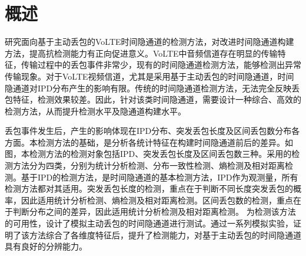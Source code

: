 \section{概述}
\label{chap:analyze:overview}

研究面向基于主动丢包的VoLTE时间隐通道的检测方法，对改进时间隐通道构建方法，提高抗检测能力有正向促进意义。VoLTE中音频信道存在明显的传输特征，传输过程中的丢包事件非常少，现有的时间隐通道检测方法，能够检测出异常传输现象。对于VoLTE视频信道，尤其是采用基于主动丢包的时间隐通道，时间隐通道对IPD分布产生的影响有限。传统的时间隐通道检测方法，无法完全反映丢包特征，检测效果较差。因此，针对该类时间隐通道，需要设计一种综合、高效的检测方法，从而提升检测水平及隐通道构建水平。


丢包事件发生后，产生的影响体现在IPD分布、突发丢包长度及区间丢包数分布各方面。本检测方法的基础，是分析各统计特征在构建时间隐通道前后的差异。如图，本检测方法的检测对象包括IPD、突发丢包长度及区间丢包数三种。采用的检测方法分为四类，分别为统计分析检测、分布一致性检测、熵检测及相对距离检测。基于IPD的检测方法，是时间隐通道的基本检测方法，IPD作为观测量，所有检测方法都对其适用。突发丢包长度的检测，重点在于判断不同长度突发丢包的概率，因此适用统计分析检测、熵检测及相对距离检测。区间丢包数的检测，重点在于判断分布之间的差异，因此适用统计分析检测及相对距离检测。
为检测该方法的可用性，设计了模拟主动丢包的时间隐通道进行测试。通过一系列模拟实验，证明了该方法综合了各维度特征后，提升了检测能力，对基于主动丢包的时间隐通道具有良好的分辨能力。